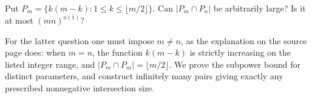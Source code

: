 Put $P_m=\{k(m-k):1\le k\le\lfloor m/2\rfloor\}$. Can $|P_m\cap P_n|$ be arbitrarily large? Is it at most $(mn)^{o(1)}$?

For the latter question one must impose $m\ne n$, as the explanation on the source page does: when $m=n$, the function $k(m-k)$ is strictly increasing on the listed integer range, and $|P_m\cap P_m|=\lfloor m/2\rfloor$. We prove the subpower bound for distinct parameters, and construct infinitely many pairs giving exactly any prescribed nonnegative intersection size.
